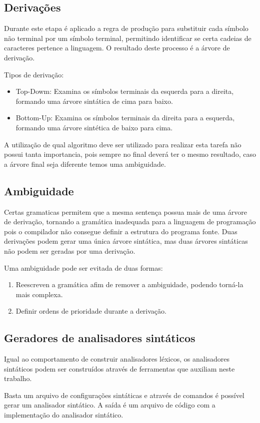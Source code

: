 \subsection{Derivações}

Durante este etapa é aplicado a regra de produção para substituir cada símbolo não terminal por um símbolo terminal,
permitindo identificar se certa cadeias de caracteres pertence a linguagem.
O resultado deste processo é a árvore de derivação.

Tipos de derivação:

\begin{itemize}
  \item Top-Dowm: Examina os símbolos terminais da esquerda para a direita, formando uma árvore sintática de cima para baixo.
  \item Bottom-Up: Examina os símbolos terminais da direita para a esquerda, formando uma árvore sintética de baixo para cima.
\end{itemize}

A utilização de qual algoritmo deve ser utilizado para realizar esta tarefa não possui tanta importancia,
pois sempre no final deverá ter o mesmo resultado,
caso a árvore final seja diferente temos uma ambiguidade.

\subsection{Ambiguidade}

Certas gramaticas permitem que a mesma sentença possua mais de uma árvore de derivação,
tornando a gramática inadequada para a linguagem de programação pois o compilador não consegue definir a estrutura do programa fonte.
Duas derivações podem gerar uma única árvore sintática, mas duas árvores sintáticas não podem ser geradas por uma derivação.

Uma ambiguidade pode ser evitada de duas formas:

\begin{enumerate}
  \item Reescreven a gramática afim de remover a ambiguidade, podendo torná-la mais complexa.
  \item Definir ordens de prioridade durante a derivação.
\end{enumerate}

\subsection{Geradores de analisadores sintáticos}

Igual ao comportamento de construir analisadores léxicos, os analisadores sintáticos podem ser construídos através de ferramentas que auxiliam neste trabalho.

Basta um arquivo de configurações sintáticas e através de comandos é possível gerar um analisador sintático.
A saída é um arquivo de código com a implementação do analisador sintático.
